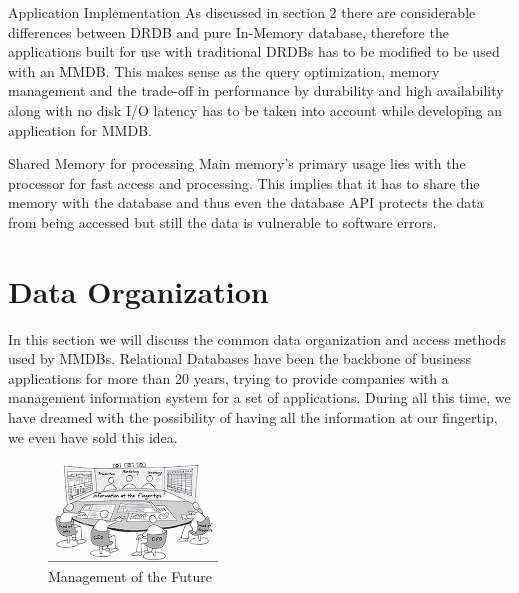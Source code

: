 \documentclass[10pt]{article} %
\begin{document}
\begin{description}
\item {Application Implementation}
As discussed in section 2 there are considerable differences between DRDB and pure In-Memory database, therefore the applications built for use with traditional DRDBs has to be modified to be used with an MMDB. This makes sense as the query optimization, memory management and the trade-off in performance by durability and high availability along with no disk I/O latency has to be taken into account while developing an application for MMDB. 

\item {Shared Memory for processing}
Main memory's primary usage lies with the processor for fast access and processing. This implies that it has to share the memory with the database and thus even the database API protects the data from being accessed but still the data is vulnerable to software errors. 

\end{description}





\section{Data Organization}

In this section we will discuss the common data organization and access methods used by MMDBs. Relational Databases have been the backbone of business applications for more  than 20 years, trying to provide companies with a management information system for a set of applications. During all this time, we have dreamed with the possibility of having all the information at our fingertip, we even have sold this idea\cite{Plattner}.

\begin{figure}
  \begin{center}
    \includegraphics[width=0.4\textwidth]{./pictures/fig5}
  \end{center}
  \caption{Management of the Future}
  \label{fig:fig5}
\end{figure}
\end{document}
